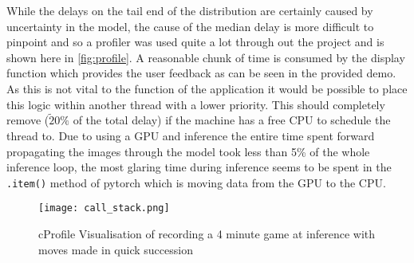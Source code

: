 While the delays on the tail end of the distribution are certainly caused by uncertainty in the model, the cause of the median delay is more difficult to 
pinpoint and so a profiler was used quite a lot through out the project and is shown here in \autoref{fig:profile}.  A reasonable chunk of time is consumed 
by the display function which provides the user feedback as can be seen in the provided demo.  As this is not vital to the function of the application it would 
be possible to place this logic within another thread with a lower priority.  This should completely remove ($\tilde20\%$ of the total delay) if the machine
has a free CPU to schedule the thread to.  Due to using a GPU and inference the entire time spent forward propagating the images through the model took less than 
5\% of the whole inference loop, the most glaring time during inference seems to be spent in the \verb|.item()| method of pytorch which is moving data from the GPU to 
the CPU. 

\begin{figure}[h]
    \centering
    \texttt{[image: call\_stack.png]}
    \caption{cProfile Visualisation of recording a 4 minute game at inference with moves made in quick succession}
    \label{fig:profile}
\end{figure}